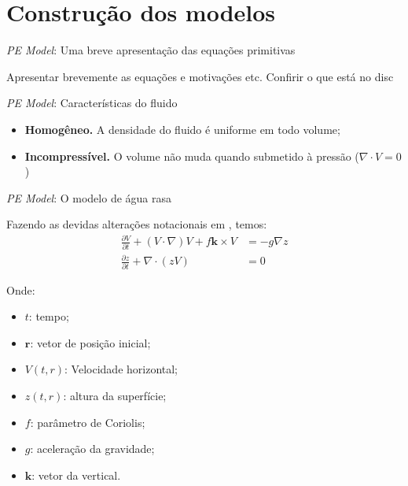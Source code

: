 \section{Construção dos modelos} 


\begin{frame}{\textit{PE Model}: Uma breve apresentação das equações primitivas}
		
	\begin{center}
		\large Apresentar brevemente as equações e motivações etc. Confirir o que está no disc
	\end{center}
\end{frame}


\begin{frame}{\textit{PE Model}: Características do fluido}
	\begin{itemize}
		\item \textbf{Homogêneo.} A densidade do fluido é uniforme em todo volume;
		\item \textbf{Incompressível.} O volume não muda quando submetido à pressão ($\nabla \cdot V = 0$)
	\end{itemize}
\end{frame}


\begin{frame}{\textit{PE Model}: O modelo de água rasa}
		
	Fazendo as devidas alterações notacionais em \cite{salmon1998}, temos:
	\begin{align}
		\frac{\partial V}{\partial t} + (V \cdot \nabla)V + f \mathbf{k} \times V & = -g \nabla z \label{eq:agua-rasa-1} \\
		\frac{\partial z}{\partial t} + \nabla \cdot (z V)                        & = 0 \label{eq:agua-rasa-2}           
	\end{align}
		
	\begin{small}
		Onde:
		\begin{multicols}{2}
			\begin{itemize}
				\item $t$: tempo;
				\item $\mathbf{r}$: vetor de posição inicial;
				\item $V(t,r)$: Velocidade horizontal;
				\item $z(t,r)$: altura da superfície;
				\item $f$: parâmetro de Coriolis;
				\item $g$: aceleração da gravidade;
				\item $\mathbf{k}$: vetor da vertical.
			\end{itemize}
		\end{multicols}
	\end{small}
\end{frame}

